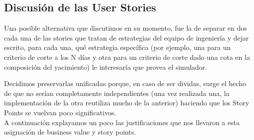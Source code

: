 \subsection{Discusión de las User Stories}

Una posible alternativa que discutimos en su momento, fue la de separar en dos cada una de las stories que tratan de estrategias del equipo de ingeniería y dejar escrito, para cada una, qué estrategia específica (por ejemplo, una para un criterio de corte a los N días y otra para un criterio de corte dado una cota en la composición del yacimiento) le interesaría que provea el simulador.

Decidimos preservarlas unificadas porque, en caso de ser dividas, surge el hecho de que no serían completamente independientes (una vez realizada una, la implementación de la otra reutiliza mucho de la anterior) haciendo que los Story Points se vuelvan poco significativos.
\\

A continuación explayamos un poco las justificaciones que nos llevaron a esta asignación de business value y story points.

